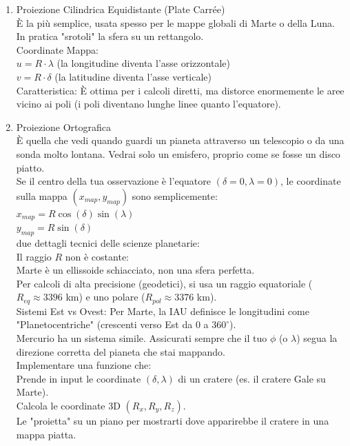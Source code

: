 \documentclass[a4paper,14pt]{article}
\begin{document}
\begin{enumerate}
\item Proiezione Cilindrica Equidistante (Plate Carrée)\\
È la più semplice, usata spesso per le mappe globali di Marte o della Luna.\\
In pratica "srotoli" la sfera su un rettangolo.\\
Coordinate Mappa:\\
\(u=R\cdot \lambda \) (la longitudine diventa l'asse orizzontale)\\
\(v=R\cdot \delta \) (la latitudine diventa l'asse verticale)\\
Caratteristica: È ottima per i calcoli diretti, ma distorce enormemente le aree vicino ai poli (i poli diventano lunghe linee quanto l'equatore).\\
\item Proiezione Ortografica\\
È quella che vedi quando guardi un pianeta attraverso un telescopio o da una sonda molto lontana. Vedrai solo un emisfero, proprio come se fosse un disco piatto.\\ Se il centro della tua osservazione è l'equatore \((\delta =0,\lambda =0)\), le coordinate sulla mappa \((x_{map},y_{map})\) sono semplicemente:\\
\(x_{map}=R\cos (\delta )\sin (\lambda )\)\\
\(y_{map}=R\sin (\delta )\)\\
due dettagli tecnici delle scienze planetarie:\\
Il raggio \(R\) non è costante:\\
Marte è un ellissoide schiacciato, non una sfera perfetta.\\
Per calcoli di alta precisione (geodetici), si usa un raggio equatoriale (\(R_{eq}\approx 3396\) km) e uno polare (\(R_{pol}\approx 3376\) km).\\
Sistemi Est vs Ovest: Per Marte, la IAU definisce le longitudini come "Planetocentriche" (crescenti verso Est da \(0\) a \(360^{\circ }\)).\\
Mercurio ha un sistema simile. Assicurati sempre che il tuo \(\phi \) (o \(\lambda \)) segua la direzione corretta del pianeta che stai mappando.\\
Implementare una funzione che:\\
Prende in input le coordinate \((\delta ,\lambda )\) di un cratere (es. il cratere Gale su Marte).\\
Calcola le coordinate 3D \((R_{x},R_{y},R_{z})\).\\
Le "proietta" su un piano per mostrarti dove apparirebbe il cratere in una mappa piatta.
\end{enumerate}
\end{document}
